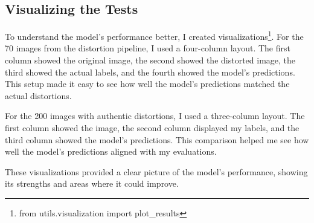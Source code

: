\subsection{Visualizing the Tests}
\label{sub:VizModelPerformance}
To understand the model’s performance better, I created visualizations\footnote{from utils.visualization import plot\_results}. For the 70 images from the distortion pipeline, I used a four-column layout. The first column showed the original image, the second showed the distorted image, the third showed the actual labels, and the fourth showed the model’s predictions. This setup made it easy to see how well the model’s predictions matched the actual distortions. \par
\vspace{\baselineskip}
\noindent
For the 200 images with authentic distortions, I used a three-column layout. The first column showed the image, the second column displayed my labels, and the third column showed the model’s predictions. This comparison helped me see how well the model’s predictions aligned with my evaluations. \par
\vspace{\baselineskip}
\noindent
These visualizations provided a clear picture of the model’s performance, showing its strengths and areas where it could improve. \par